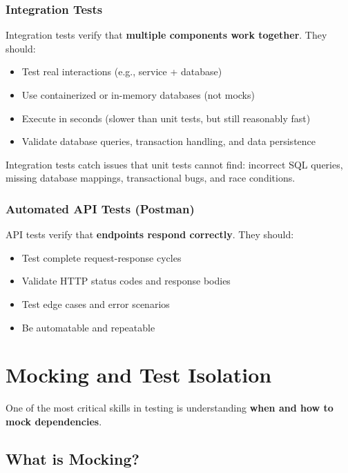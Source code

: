 \documentclass[12pt,a4paper]{article}
\begin{document}
\subsubsection{Integration Tests}

Integration tests verify that \textbf{multiple components work together}. They should:

\begin{itemize}
    \item Test real interactions (e.g., service + database)
    \item Use containerized or in-memory databases (not mocks)
    \item Execute in seconds (slower than unit tests, but still reasonably fast)
    \item Validate database queries, transaction handling, and data persistence
\end{itemize}

\begin{tipbox}
Integration tests catch issues that unit tests cannot find: incorrect SQL queries, missing database mappings, transactional bugs, and race conditions.
\end{tipbox}

\subsubsection{Automated API Tests (Postman)}

API tests verify that \textbf{endpoints respond correctly}. They should:

\begin{itemize}
    \item Test complete request-response cycles
    \item Validate HTTP status codes and response bodies
    \item Test edge cases and error scenarios
    \item Be automatable and repeatable
\end{itemize}

\section{Mocking and Test Isolation}

One of the most critical skills in testing is understanding \textbf{when and how to mock dependencies}.

\subsection{What is Mocking?}
\end{document}
